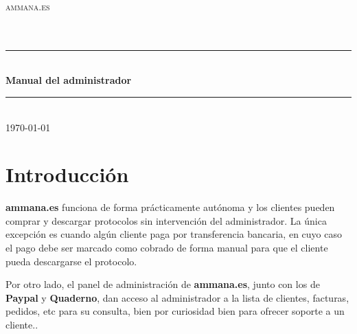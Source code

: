 \documentclass[12pt, spanish]{article} %
\begin{document}
\begin{titlepage}

\newcommand{\HRule}{\rule{\linewidth}{0.5mm}} %

\center %

\textsc{\LARGE ammana.es}\\[1.5cm] %
\textsc{\Large }\\[0.5cm] %
\textsc{\large }\\[0.5cm] %

\HRule \\[0.4cm]
{ \huge \bfseries Manual del administrador}\\[0.4cm] %
\HRule \\[1.5cm]

{\large \today}\\[3cm] %


\vfill %

\end{titlepage}

\tableofcontents %

\newpage %

\section{Introducción}

\textbf{ammana.es} funciona de forma prácticamente autónoma y los clientes pueden
comprar y descargar protocolos sin intervención del administrador. La única
excepción es cuando algún cliente paga por transferencia bancaria, en cuyo
caso el pago debe ser marcado como cobrado de forma manual para que el cliente
pueda descargarse el protocolo.

Por otro lado, el panel de administración de \textbf{ammana.es}, junto con los de \textbf{Paypal} y
\textbf{Quaderno}, dan acceso al administrador a la lista de clientes, facturas, pedidos, etc
para su consulta, bien por curiosidad bien para ofrecer soporte a un cliente..
\end{document}
